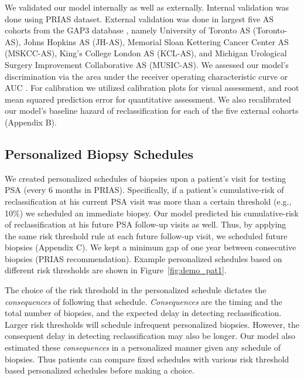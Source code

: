 We validated our model internally as well as externally. Internal validation was done using PRIAS dataset. External validation was done in largest five AS cohorts from the GAP3 database \citep{gap3_2018}, namely University of Toronto AS (Toronto-AS), Johns Hopkins AS (JH-AS), Memorial Sloan Kettering Cancer Center AS (MSKCC-AS), King's College London AS (KCL-AS), and Michigan Urological Surgery Improvement Collaborative AS (MUSIC-AS). We assessed our model's discrimination via the area under the receiver operating characteristic curve or AUC \cite{rizopoulos2017dynamic}. For calibration we utilized calibration plots for visual assessment, and root mean squared prediction error \cite{rizopoulos2017dynamic} for quantitative assessment. We also recalibrated our model's baseline hazard of reclassification for each of the five external cohorts (Appendix B).

\subsection{Personalized Biopsy Schedules}
We created personalized schedules of biopsies upon a patient's visit for testing PSA (every 6 months in PRIAS). Specifically, if a patient's cumulative-risk of reclassification at his current PSA visit was more than a certain threshold (e.g., 10\%) we scheduled an immediate biopsy. Our model predicted his cumulative-risk of reclassification at his future PSA follow-up visits as well. Thus, by applying the same risk threshold rule at each future follow-up visit, we scheduled future biopsies (Appendix C). We kept a minimum gap of one year between consecutive biopsies (PRIAS recommendation). Example personalized schedules based on different risk thresholds are shown in Figure~\ref{fig:demo_pat1}.

The choice of the risk threshold in the personalized schedule dictates the \textit{consequences} of following that schedule. \textit{Consequences} are the timing and the total number of biopsies, and the expected delay in detecting reclassification. Larger risk thresholds will schedule infrequent personalized biopsies. However, the consequent delay in detecting reclassification may also be longer. Our model also estimated these \textit{consequences} in a personalized manner given any schedule of biopsies. Thus patients can compare fixed schedules with various risk threshold based personalized schedules before making a choice.

